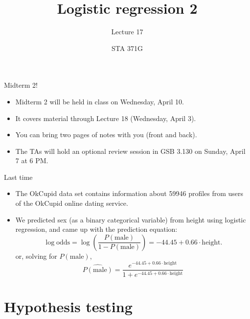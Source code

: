 \documentclass{beamer}\usepackage[]{graphicx}\usepackage[]{color}
\title{Logistic regression 2}
\subtitle{Lecture 17}
\author{STA 371G}
\begin{document}
  
  

  \frame{\maketitle}



  \begin{darkframes}
    \begin{frame}{Midterm 2!}
      \begin{itemize}
        \item Midterm 2 will be held in class on Wednesday, April 10.
        \item It covers material through Lecture 18 (Wednesday, April 3).
        \item You can bring \alert{two} pages of notes with you (front and back).
        \item The TAs will hold an optional review session in \alert{GSB 3.130} on Sunday, April 7 at 6 PM.
      \end{itemize}
    \end{frame}

    \begin{frame}{Last time}

      \begin{itemize}
        \item The OkCupid data set contains information about 59946 profiles from users of the OkCupid online dating service.
        \item We predicted sex (as a binary categorical variable) from height using logistic regression, and came up with the prediction equation:
        \[
          \log\text{odds} = \log\left(\frac{P(\text{male})}{1-P(\text{male})}\right) = -44.45 + 0.66\cdot\text{height}.
        \]
        or, solving for $P(\text{male})$,
        \[
          \widehat{P(\text{male})} = \frac{e^{-44.45 + 0.66\cdot\text{height}}}{1 + e^{-44.45 + 0.66\cdot\text{height}}}
        \]
      \end{itemize}
    \end{frame}

    \section{Hypothesis testing}


\end{darkframes}
\end{document}
